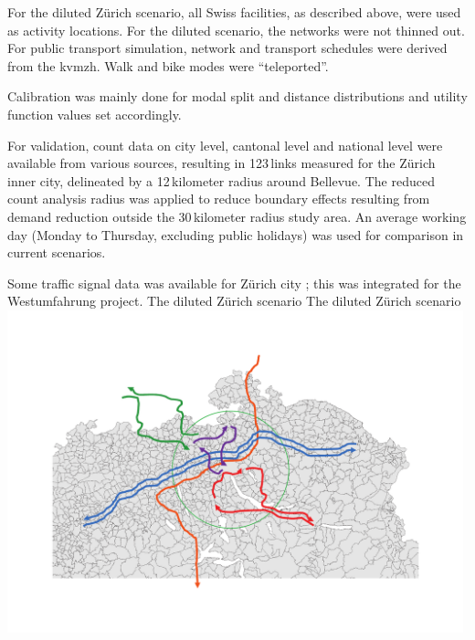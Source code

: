 For the diluted Zürich scenario, all Swiss facilities, as described above, were used as activity locations. For the diluted scenario, the networks were not thinned out. For  public transport simulation, network and transport schedules were derived from the \gls{kvmzh}. Walk and bike modes were ``teleported''. 

Calibration was mainly done for modal split and distance distributions and utility function values set accordingly.

For validation, count data on city level, cantonal level and national level \citep[][]{ASTRA_Webpage_2006} were available from various sources, resulting in 123\,links measured for the Zürich inner city, delineated by a 12\,kilometer radius around Bellevue. The reduced count analysis radius was applied to reduce boundary effects resulting from demand reduction outside the 30\,kilometer radius study area. An average working day (Monday to Thursday, excluding public holidays) was used for comparison in current scenarios.

Some traffic signal data was available for Zürich city \citep[][]{STAPOZH-DAV_unpub_gtZH_2008}; this was integrated for the Westumfahrung project.
%
\createfigure%
{The diluted Zürich scenario}%
{The diluted Zürich scenario}%
{\label{fig:zurichScenario}}%
{\includegraphics[width=0.99\textwidth, angle=0]{using/figures/zh.pdf}}%
{}

